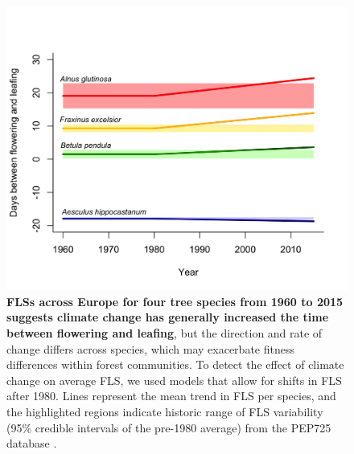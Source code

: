\documentclass{article}
\begin{document}
\begin{figure}[h!]
    \centering
 \includegraphics[width=\textwidth]{..//PEP725/FLS_climate_change.jpeg} 
    \caption{\textbf{FLSs across Europe for four tree species from 1960 to 2015 suggests climate change has generally increased the time between flowering and leafing}, but the direction and rate of change differs across species, which may exacerbate fitness differences within forest communities. To detect the effect of climate change on average FLS, we used models that allow for shifts in FLS after 1980. Lines represent the mean trend in FLS per species, and the highlighted regions indicate historic range of FLS variability (95\% credible intervals of the pre-1980 average) from the PEP725 database \citep{PEP725}.}
    \label{fig:climchange}
\end{figure}
 
\end{document}
